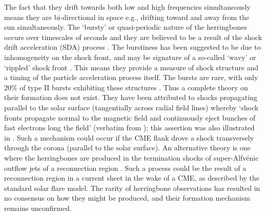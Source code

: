 The fact that they drift towards both low and high frequencies simultaneously means they are bi-directional in space e.g., drifting toward and away from the sun simultaneously. The `bursty' or quasi-periodic nature of the herringbones occurs over timescales of seconds \citep{mann1995, mann2005} and they are believed to be a result of the shock drift acceleration (SDA) process \citep{miteva2007}. The burstiness has been suggested to be due to inhomogeneity on the shock front, and may be signature of a so-called `wavy' or `rippled' shock front \citep{zlobec1993, guo2010, vandas2011}. This means they provide a measure of shock structure and a timing of the particle acceleration process itself. The bursts are rare, with only 20\% of type II bursts exhibiting these structures \citep{cairns1987}. Thus a complete theory on their formation does not exist. They have been attributed to shocks propagating parallel to the solar surface (tangentially across radial field lines) whereby \textquoteleft shock fronts propagate normal to the magnetic field and continuously eject bunches of fast electrons long the field' (verbatim from \citet{wild1964}); this assertion was also illustrated in \citet{stewart1980}. Such a mechanism could occur if the CME flank drove a shock transversely through the corona (parallel to the solar surface). An alternative theory is one where the herringbones are produced in the termination shocks of super-Alfv\'{e}nic outflow jets of a reconnection region \citep{aurass2002, aurass2004}. Such a process could be the result of a reconnection region in a current sheet in the wake of a CME, as described by the standard solar flare model. The rarity of herringbone observations has resulted in no consensus on how they might be produced, and their formation mechanism remains unconfirmed.
